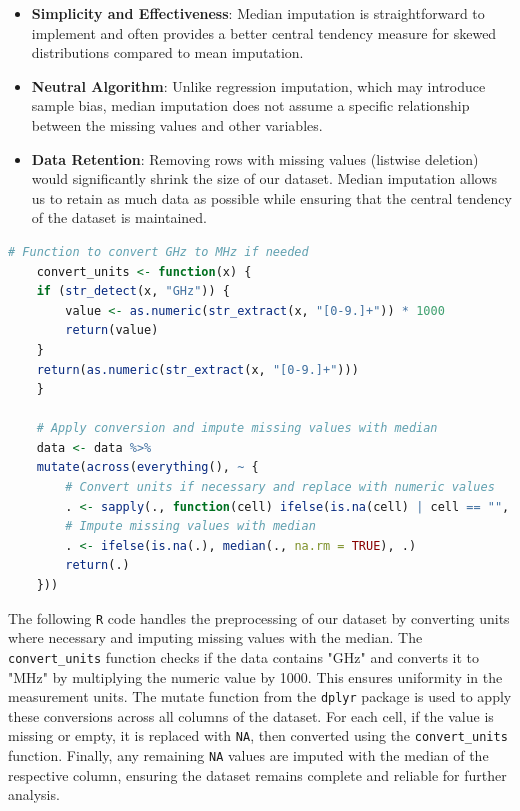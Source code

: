 \begin{itemize}
\item \textbf{Simplicity and Effectiveness}: Median imputation is straightforward to implement and often provides a better central tendency measure for skewed distributions compared to mean imputation.
\item \textbf{Neutral Algorithm}: Unlike regression imputation, which may introduce sample bias, median imputation does not assume a specific relationship between the missing values and other variables.
\item \textbf{Data Retention}: Removing rows with missing values (listwise deletion) would significantly shrink the size of our dataset. Median imputation allows us to retain as much data as possible while ensuring that the central tendency of the dataset is maintained.
\end{itemize}


\begin{lstlisting}[language=R]
    # Function to convert GHz to MHz if needed
    convert_units <- function(x) {
    if (str_detect(x, "GHz")) {
        value <- as.numeric(str_extract(x, "[0-9.]+")) * 1000
        return(value)
    }
    return(as.numeric(str_extract(x, "[0-9.]+")))
    }

    # Apply conversion and impute missing values with median
    data <- data %>%
    mutate(across(everything(), ~ {
        # Convert units if necessary and replace with numeric values
        . <- sapply(., function(cell) ifelse(is.na(cell) | cell == "", NA, convert_units(cell)))
        # Impute missing values with median
        . <- ifelse(is.na(.), median(., na.rm = TRUE), .)
        return(.)
    }))
\end{lstlisting}

The following \texttt{R} code handles the preprocessing of our dataset by converting units where necessary and imputing missing values with the median. The \texttt{convert\_units} function checks if the data contains "GHz" and converts it to "MHz" by multiplying the numeric value by 1000. This ensures uniformity in the measurement units. The mutate function from the \texttt{dplyr} package is used to apply these conversions across all columns of the dataset. For each cell, if the value is missing or empty, it is replaced with \texttt{NA}, then converted using the \texttt{convert\_units} function. Finally, any remaining \texttt{NA} values are imputed with the median of the respective column, ensuring the dataset remains complete and reliable for further analysis.


\newpage